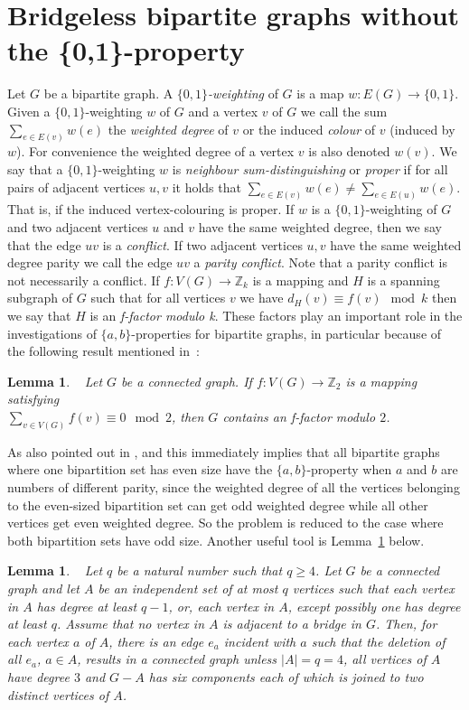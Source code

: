 \documentclass[
final,
 nomarks,
]{dmtcs-episciences}
\newtheorem{lemma}[theorem]{Lemma}
\theoremstyle{definition}
\begin{document}
\section{Bridgeless bipartite graphs without the \{0,1\}-property} 
\label{sec1}
Let $G$ be a bipartite graph. A \emph{$\{0,1\}$-weighting} of $G$ is a map $w: E(G) \rightarrow \{0,1\}$. Given a $\{0,1\}$-weighting $w$ of $G$ and a vertex $v$ of $G$ we call the sum $\sum_{e \in E(v)}w(e)$ the \textit{weighted degree} of $v$ or the induced \textit{colour} of $v$ (induced by $w$). For convenience the weighted degree of a vertex $v$ is also denoted $w(v)$. We say that a $\{0,1\}$-weighting $w$ is \textit{neighbour sum-distinguishing} or \textit{proper} if for all pairs of adjacent vertices $u, v$ it holds that $\sum_{e \in E(v)}w(e) \neq \sum_{e \in E(u)}w(e)$. That is, if the induced vertex-colouring is proper. If $w$ is a $\{0,1\}$-weighting of $G$ and two adjacent vertices $u$ and $v$ have the same weighted degree, then we say that the edge $uv$ is a \textit{conflict}. If two adjacent vertices $u,v$ have the same weighted degree parity we call the edge $uv$ a \textit{parity conflict}. Note that a parity conflict is not necessarily a conflict. If $f : V(G) \rightarrow \mathbb{Z}_k$ is a mapping and $H$ is a spanning subgraph of $G$ such that for all vertices $v$ we have $d_H(v) \equiv f(v) \mod k$ then we say that $H$ is an \textit{f-factor modulo k}. These factors play an important role in the investigations of $\{a,b\}$-properties for bipartite graphs, in particular because of the following result mentioned in~\cite{TWZ}:
\begin{lemma} \label{lem:f-factor}\emph{~\cite{TWZ}}
Let $G$ be a connected graph. If $f: V(G) \rightarrow \mathbb{Z}_2$ is a mapping satisfying \\ $\sum_{v \in V(G)} f(v) \equiv 0 \mod 2 $, then $G$ contains an \textit{f-factor} modulo $2$.
\end{lemma}
\noindent As also pointed out in \cite{kha}, \cite{skow} and \cite{TWZ} this immediately implies that all bipartite graphs where one bipartition set has even size have the $\{a,b\}$-property when $a$ and $b$ are numbers of different parity, since the weighted degree of all the vertices belonging to the even-sized bipartition set can get odd weighted degree while all other vertices get even weighted degree. So the problem is reduced to the case where both bipartition sets have odd size. Another useful tool is Lemma~\ref{lem:remove-edges} below.
\begin{lemma} \label{lem:remove-edges}\emph{~\cite{TWZ}}
Let $q$ be a natural number such that  $ q \geq 4$. Let $G$ be a connected graph and let $A$ be an independent set of at most $q$ vertices such that each vertex in $A$ has degree at least $q-1$, or, each vertex in $A$, except possibly one has degree at least $q$. Assume that no vertex in $A$ is adjacent to a bridge in $G$. Then, for each vertex $a$ of $A$, there is an edge $e_a$ incident with $a$ such that the deletion of all $e_a$, $a \in A$, results in a connected graph unless $|A|=q=4$, all vertices of $A$ have degree $3$ and $G-A$ has six components each of which is joined to two distinct vertices of $A$.
\end{lemma}
\end{document}
